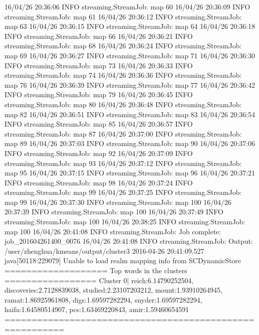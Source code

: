 16/04/26 20:36:06 INFO streaming.StreamJob:  map 60%
16/04/26 20:36:09 INFO streaming.StreamJob:  map 61%
16/04/26 20:36:12 INFO streaming.StreamJob:  map 63%
16/04/26 20:36:15 INFO streaming.StreamJob:  map 64%
16/04/26 20:36:18 INFO streaming.StreamJob:  map 66%
16/04/26 20:36:21 INFO streaming.StreamJob:  map 68%
16/04/26 20:36:24 INFO streaming.StreamJob:  map 69%
16/04/26 20:36:27 INFO streaming.StreamJob:  map 71%
16/04/26 20:36:30 INFO streaming.StreamJob:  map 73%
16/04/26 20:36:33 INFO streaming.StreamJob:  map 74%
16/04/26 20:36:36 INFO streaming.StreamJob:  map 76%
16/04/26 20:36:39 INFO streaming.StreamJob:  map 77%
16/04/26 20:36:42 INFO streaming.StreamJob:  map 79%
16/04/26 20:36:45 INFO streaming.StreamJob:  map 80%
16/04/26 20:36:48 INFO streaming.StreamJob:  map 82%
16/04/26 20:36:51 INFO streaming.StreamJob:  map 83%
16/04/26 20:36:54 INFO streaming.StreamJob:  map 85%
16/04/26 20:36:57 INFO streaming.StreamJob:  map 87%
16/04/26 20:37:00 INFO streaming.StreamJob:  map 89%
16/04/26 20:37:03 INFO streaming.StreamJob:  map 90%
16/04/26 20:37:06 INFO streaming.StreamJob:  map 92%
16/04/26 20:37:09 INFO streaming.StreamJob:  map 93%
16/04/26 20:37:12 INFO streaming.StreamJob:  map 95%
16/04/26 20:37:15 INFO streaming.StreamJob:  map 96%
16/04/26 20:37:21 INFO streaming.StreamJob:  map 98%
16/04/26 20:37:24 INFO streaming.StreamJob:  map 99%
16/04/26 20:37:25 INFO streaming.StreamJob:  map 99%
16/04/26 20:37:30 INFO streaming.StreamJob:  map 100%
16/04/26 20:37:39 INFO streaming.StreamJob:  map 100%
16/04/26 20:37:49 INFO streaming.StreamJob:  map 100%
16/04/26 20:38:25 INFO streaming.StreamJob:  map 100%
16/04/26 20:41:08 INFO streaming.StreamJob: Job complete: job_201604261400_0076
16/04/26 20:41:08 INFO streaming.StreamJob: Output: /user/zhenghua/kmeans/output/cluster3
2016-04-26 20:41:09.527 java[50118:229079] Unable to load realm mapping info from SCDynamicStore
=================== Top words in the clusters ================= 
Cluster 0| reich:6.14790252504, discoveries:2.7128839038, studied:2.23107203212, mount:1.93910264945, ramat:1.86925961808, digs:1.69597282294, snyder:1.69597282294, haifa:1.64580514907, pcs:1.63469220843, amir:1.59460654591
========================================================= 

